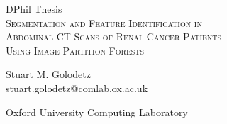 \begin{titlepage}

\begin{center}

\vspace*{7.5cm}

\normalsize DPhil Thesis\\
\LARGE \textsc{Segmentation and Feature Identification in\\Abdominal CT Scans of Renal Cancer Patients\\Using Image Partition Forests}\\

\vspace{2mm}


\vspace{-5mm}

\large Stuart M. Golodetz\\
\small stuart.golodetz@comlab.ox.ac.uk\\

\vspace{2mm}

\small Oxford University Computing Laboratory

\end{center}

\end{titlepage}